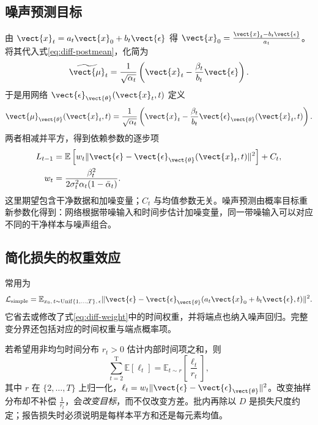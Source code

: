 \documentclass[../textbook.tex]{subfiles}
\begin{document}
\subsection{噪声预测目标}
由 $\vect{x}_t=a_t\vect{x}_0+b_t\vect{\epsilon}$ 得 $\vect{x}_0=\frac{\vect{x}_t-b_t\vect{\epsilon}}{a_t}$。将其代入式\eqref{eq:diff-postmean}，化简为
\begin{equation}
 \widetilde{\vect{\mu}}_t=\frac1{\sqrt{\alpha_t}}\left(\vect{x}_t-\frac{\beta_t}{b_t}\vect{\epsilon}\right).
\end{equation}
于是用网络 $\vect{\epsilon}_{\vect{\theta}}(\vect{x}_t,t)$ 定义
\begin{equation}
 \vect{\mu}_{\vect{\theta}}(\vect{x}_t,t)=\frac1{\sqrt{\alpha_t}}\left(\vect{x}_t-\frac{\beta_t}{b_t}\vect{\epsilon}_{\vect{\theta}}(\vect{x}_t,t)\right).
 \label{eq:diff-epsmean}
\end{equation}
两者相减并平方，得到依赖参数的逐步项
\begin{equation}\label{eq:diff-weight}
 \begin{aligned}
  L_{t-1}&=\mathbb E\left[w_t\|\vect{\epsilon}-\vect{\epsilon}_{\vect{\theta}}(\vect{x}_t,t)\|^2\right]+C_t,\\
  w_t&=\frac{\beta_t^2}{2\sigma_t^2\alpha_t(1-\bar\alpha_t)}.
 \end{aligned}
\end{equation}
这里期望包含干净数据和加噪变量；$C_t$ 与均值参数无关。噪声预测由概率目标重新参数化得到：网络根据带噪输入和时间步估计加噪变量，同一带噪输入可以对应不同的干净样本与噪声组合。

\subsection{简化损失的权重效应}
常用为
\begin{equation}
 \mathcal L_{\mathrm{simple}}=\mathbb E_{x_0,\,t\sim\operatorname{Unif}\{1,\ldots,T\},\,\epsilon}
 \|\vect{\epsilon}-\vect{\epsilon}_{\vect{\theta}}(a_t\vect{x}_0+b_t\vect{\epsilon},t)\|^2.
\end{equation}
它省去或修改了式\eqref{eq:diff-weight}中的时间权重，并将端点也纳入噪声回归。完整变分界还包括对应的时间权重与端点概率项。

若希望用非均匀时间分布 $r_t>0$ 估计内部时间项之和，则
\begin{equation}
 \sum_{t=2}^{\mathrm{T}}\mathbb E[\ell_t]=\mathbb E_{t\sim r}\left[\frac{\ell_t}{r_t}\right],
\end{equation}
其中 $r$ 在 $\{2,\ldots,T\}$ 上归一化，$\ell_t=w_t\|\vect{\epsilon}-\vect{\epsilon}_{\vect{\theta}}\|^2$。改变抽样分布却不补偿 $\frac{1}{r_t}$，会\emph{改变目标}，而不仅改变方差。批内再除以 $D$ 是损失尺度约定；报告损失时必须说明是每样本平方和还是每元素均值。
\end{document}
